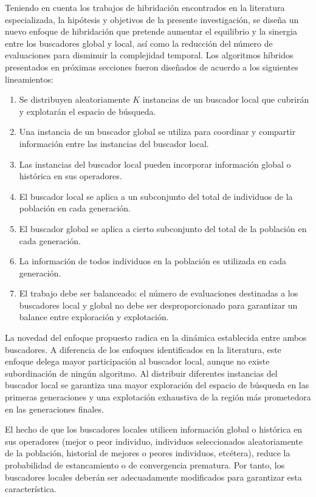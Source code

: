 Teniendo en cuenta los trabajos de hibridación encontrados en la literatura especializada, la hipótesis y objetivos de la presente investigación, se diseña un nuevo enfoque de hibridación que pretende aumentar el equilibrio y la sinergia entre los buscadores global y local, así como la reducción del número de evaluaciones para disminuir la complejidad temporal. Los algoritmos híbridos presentados en próximas secciones fueron diseñados de acuerdo a los siguientes lineamientos:
\begin{enumerate}
\item Se distribuyen aleatoriamente $K$ instancias de un buscador local que cubrirán y explotarán el espacio de búsqueda.
\item Una instancia de un buscador global se utiliza para coordinar y compartir información entre las instancias del buscador local.
\item Las instancias del buscador local pueden incorporar información global o histórica en sus operadores.
\item El buscador local se aplica a un subconjunto del total de individuos de la población en cada generación.
\item El buscador global se aplica a cierto subconjunto del total de la población en cada generación.
\item La información de todos individuos en la población es utilizada en cada generación.
\item El trabajo debe ser balanceado: el número de evaluaciones destinadas a los buscadores local y global no debe ser desproporcionado para garantizar un balance entre exploración y explotación.
\end{enumerate}
\newpage
La novedad del enfoque propuesto radica en la dinámica establecida entre ambos buscadores. A diferencia de los enfoques identificados en la literatura, este enfoque delega mayor participación al buscador local, aunque no existe subordinación de ningún algoritmo. Al distribuir diferentes instancias del buscador local se garantiza una mayor exploración del espacio de búsqueda en las primeras generaciones y una explotación exhaustiva de la región más prometedora en las generaciones finales.

El hecho de que los buscadores locales utilicen información global o histórica en sus operadores (mejor o peor individuo, individuos seleccionados aleatoriamente de la población, historial de mejores o peores individuos, etcétera), reduce la probabilidad de estancamiento o de convergencia prematura. Por tanto, los buscadores locales deberán ser adecuadamente modificados para garantizar esta característica. 

